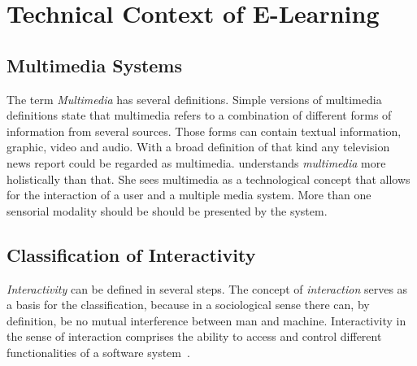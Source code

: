 \section{Technical Context of E-Learning}
\label{sec:elearn:technicalcontext}

\subsection{Multimedia Systems}
\label{sec:elearn:multimediasystems}

The term \emph{Multimedia} has several definitions. Simple versions of 
multimedia definitions state that multimedia refers to a combination of
different forms of information from several sources. Those forms can contain
textual information, graphic, video and audio. With a broad definition
of that kind any television news report could be regarded as multimedia.
 \citeyear{Richert2007} understands \emph{multimedia}
more holistically than that. She sees multimedia as a technological concept 
that allows for the interaction of a user and a multiple media system.
More than one sensorial modality should be should be presented by the system.

\subsection{Classification of Interactivity}
\label{sec:elearn:interactivity}

\emph{Interactivity} can be defined in several steps. The concept of 
\emph{interaction} serves as a basis for the classification, because in a 
sociological sense there can, by definition, be no mutual interference
between man and machine. Interactivity in the sense of interaction comprises
the ability to access and control different functionalities of a software 
system~.

